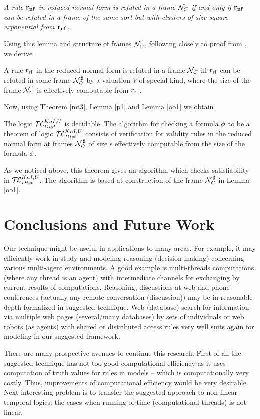 \documentclass[runningheads]{llncs}
\begin{document}
\begin{lemma} \label{oo11} {\sl A rule $\bf r_{nf}$ in reduced
normal form is refuted in a frame $\mathcal{N}_C$ if and only if $\bf r_{nf}$
can be refuted in a frame of the same sort but with clusters of size square
exponential from $\bf r_{nf}$.}
\end{lemma}

Using this lemma and structure of frames $\mathcal{N}^{\,\sharp}_C$,
following closely to proof from \cite{vris},
we derive

\begin{lemma} \label{oo1}
 A rule ${r}_{\mathrm{rf}}$ in  the reduced
normal form is refuted in a frame $\mathcal{N}_C$ iff ${r}_{\mathrm{rf}}$ can be
refuted in some frame $\mathcal{N}^{\,\sharp}_C$ by a valuation $V$ of
special kind, where the size of the frame
$\mathcal{N}^{\,\sharp}_C$ is effectively computable from ${r}_{\mathrm{rf}}$.
\end{lemma}

Now, using
 Theorem \ref{mt3}, Lemma \ref{p1} and Lemma \ref{oo1} we obtain


\begin{theorem}
\label{bn1} The logic $\mathcal{T\!L}^{KnI,U}_{Dist}$ is decidable. The algorithm for
checking a formula $\phi$ to be a theorem of logic $\mathcal{T\!L}^{KnI,U}_{Dist}$ consists
of verification for validity rules in the reduced normal form at
frames $\mathcal{N}^{\,\sharp}_C$ of size s effectively computable from the size of the
formula $\phi$.
\end{theorem}

As we noticed above, this theorem  gives an algorithm which checks satisfiability in $\mathcal{T\!L}^{KnI,U}_{Dist}$.
The algorithm is based at construction of the frame $\mathcal{N}^{\,\sharp}_C$ in Lemma \ref{oo1}. 


\section{Conclusions and Future Work}


Our
 technique might be useful in applications to many areas.
For example, it may efficiently work in study and modeling
 reasoning (decision making) concerning various multi-agent environments.
A good example is
 multi-threads  computations (where any thread is an agent) with intermediate channels for exchanging by current results of computations.
Reasoning, discussions at web and phone conferences (actually any remote conversation (discussion)) may be
in reasonable depth formalized in suggested technique.
Web (database) search for information via multiple web pages (several/many databases) by
 sets of
individuals or web robots (as agents) with shared or distributed access rules
 very well suits again for modeling in our suggested framework.



There are many prospective avenues to continue this research.
First of all the suggested technique has not too good computational efficiency as it uses
computation of truth values for rules in models -- which is computationally very costly.
Thus,  improvements of computational efficiency would be very desirable.
Next interesting problem is to transfer the suggested approach to non-linear temporal logics: the cases when running of time (computational threads)
is not linear.




\end{document}

